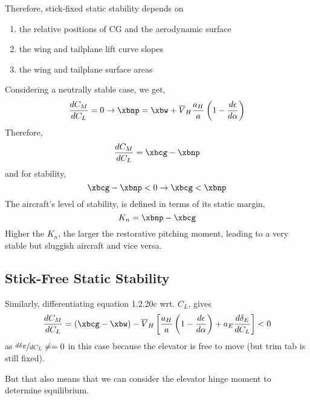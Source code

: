 Therefore, stick-fixed static stability depends on
\begin{enumerate}
  \item the relative positions of CG and the aerodynamic surface
  \item the wing and tailplane lift curve slopes
  \item the wing and tailplane surface areas
\end{enumerate}

Considering a neutrally stable case, we get,
\begin{equation}
  \frac{dC_M}{dC_L} = 0 \rightarrow \xbnp = \xbw + \overline{V}_H\frac{a_H}{a}\left(1 - \frac{d\epsilon}{d\alpha}\right)
\end{equation}
Therefore,
\begin{equation}
  \frac{dC_M}{dC_L} = \xbcg - \xbnp
\end{equation}
and for stability,
\begin{equation}
  \xbcg - \xbnp < 0 \rightarrow \xbcg < \xbnp
\end{equation}
The aircraft's level of stability, is defined in terms of its static margin,
\begin{equation}
  K_n = \xbnp - \xbcg
\end{equation}
Higher the $K_n$, the larger the restorative pitching moment, leading to a very stable but sluggish aircraft and vice versa.

\subsection{Stick-Free Static Stability}
Similarly, differentiating equation 1.2.20c wrt. $C_L$, gives
\begin{equation}
  \frac{dC_M}{dC_L} = (\xbcg - \xbw) - \overline{V}_H\left[\frac{a_H}{a}\left(1 - \frac{d\epsilon}{d\alpha}\right)+a_E\frac{d\delta_E}{dC_L}\right] < 0
\end{equation}
as $\nicefrac{d\delta_E}{dC_L} \neq = 0$ in this case because the elevator is free to move (but trim tab is still fixed).

But that also means that we can consider the elevator hinge moment to determine equilibrium.

